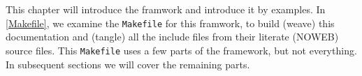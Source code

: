 This chapter will introduce the framwork and introduce it by examples.
In \cref{Makefile}, we examine the \verb'Makefile' for this framwork, \ie to 
build (weave) this documentation and (tangle) all the include files from their 
literate (NOWEB) source files.
This \verb'Makefile' uses a few parts of the framework, but not everything.
In subsequent sections we will cover the remaining parts.




